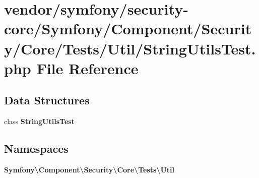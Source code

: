 \section{vendor/symfony/security-\/core/\+Symfony/\+Component/\+Security/\+Core/\+Tests/\+Util/\+String\+Utils\+Test.php File Reference}
\label{_string_utils_test_8php}
\subsection*{Data Structures}
\begin{DoxyCompactItemize}
\item 
class {\bf String\+Utils\+Test}
\end{DoxyCompactItemize}
\subsection*{Namespaces}
\begin{DoxyCompactItemize}
\item 
 {\bf Symfony\textbackslash{}\+Component\textbackslash{}\+Security\textbackslash{}\+Core\textbackslash{}\+Tests\textbackslash{}\+Util}
\end{DoxyCompactItemize}
